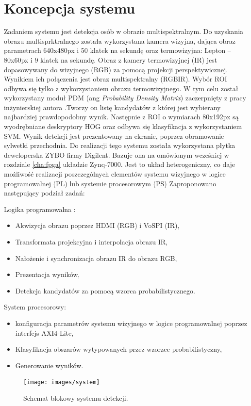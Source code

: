 \section{Koncepcja systemu}
Zadaniem systemu jest detekcja osób w obrazie multispektralnym. Do uzyskania obrazu multisprktralnego została wykorzystana kamera wizyjna, dająca obraz parametrach 640x480px i 50 klatek na sekundę oraz termowizyjna: Lepton – 80x60px i 9 klatek na sekundę. Obraz z kamery termowizyjnej (IR) jest dopasowywany do wizyjnego (RGB) za pomocą projekcji perspektywicznej. Wynikiem ich połączenia jest obraz multispektralny (RGBIR). Wybór ROI odbywa się tylko z wykorzystaniem obrazu termowizyjnego. W tym celu został wykorzystany moduł PDM (ang \textit{Probability Density Matrix}) zaczerpnięty z pracy inżynierskiej autora \cite{kankaing}.Tworzy on listę kandydatów z której jest wybierany najbardziej prawdopodobny wynik. Następnie z ROI o wymiarach 80x192px są wyodrębniane deskryptory HOG oraz odbywa się klasyfikacja z wykorzystaniem SVM. Wynik detekcji jest prezentowany na ekranie, poprzez obramowanie sylwetki przechodnia.
Do realizacji tego systemu została wykorzystana płytka deweloperska ZYBO firmy Digilent. Bazuje ona na omówionym wcześniej w rozdziale \ref{cha:fpga} układzie Zynq-7000. Jest to układ heterogeniczny, co daje możliwość realizacji poszczególnych elementów systemu wizyjnego w logice programowalnej (PL) lub systemie procesorowym (PS) 
Zaproponowano następujący podział zadań:

Logika programowalna :
\begin{itemize}
\item Akwizycja obrazu poprzez HDMI (RGB) i VoSPI (IR),
\item Transformata projekcyjna i interpolacja obrazu IR,
\item Nałożenie i synchronizacja obrazu IR do obrazu RGB,
\item Prezentacja wyników,
\item Detekcja kandydatów za pomocą wzorca probabilistycznego.
\end{itemize}
System procesorowy:
\begin{itemize}
\item konfiguracja parametrów systemu wizyjnego w logice programowalnej poprzez interfejs AXI4-Lite,
\item Klasyfikacja obszarów wytypowanych przez wzorzec probabilistyczny,
\item Generowanie wyników.
\end{itemize}
\begin{figure}[h]
    \centering
    \texttt{[image: images/system]}
    \caption{Schemat blokowy systemu detekcji.}
    \label{fig:systemwizyjny}
\end{figure}

